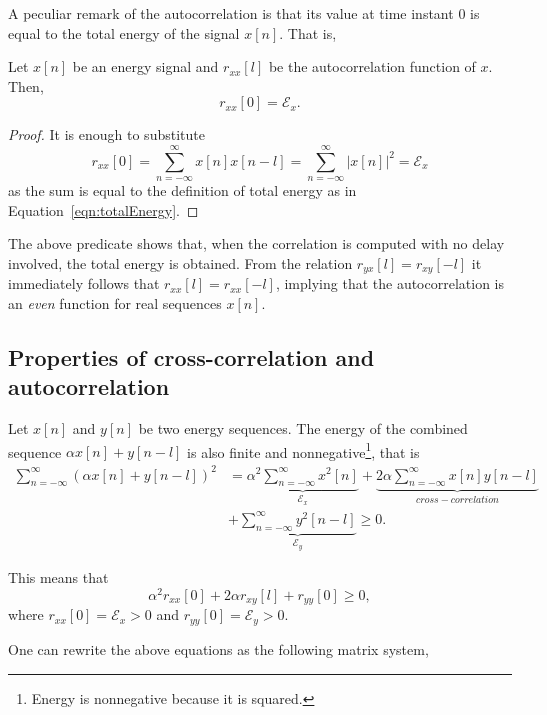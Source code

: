 \documentclass[\documentfontsize, twocolumn]{\classname}
\begin{document}
A peculiar remark of the autocorrelation is that its value at time instant $0$ is equal to the total energy of the signal $x[n]$. That is,

\begin{predicate}
    Let $x[n]$ be an energy signal and $r_{xx}[l]$ be the autocorrelation function of $x$. Then, 
    \begin{equation}\label{eqn:equivalenceAutocorrelationEnergy}
        r_{xx}[0] = \mathcal E_x.
    \end{equation}
\end{predicate}

\begin{proof}
    It is enough to substitute
    \[
        r_{xx}[0] = \sum_{n=-\infty}^\infty x[n]x[n-l] =\sum_{n=-\infty}^\infty |x[n]|^2 = \mathcal E_x
    \]
    as the sum is equal to the definition of total energy as in Equation~\ref{eqn:totalEnergy}.
\end{proof}

The above predicate shows that, when the correlation is computed with no delay involved, the total energy is obtained. From the relation $r_{yx}[l] = r_{xy}[-l]$ it immediately follows that $r_{xx}[l] = r_{xx}[-l]$, implying that the autocorrelation is an \emph{even} function for real sequences $x[n]$.

\subsection{Properties of cross-correlation and autocorrelation}
Let $x[n]$ and $y[n]$ be two energy sequences. The energy of the combined sequence $\alpha x[n] + y[n-l]$ is also finite and nonnegative\footnote{Energy is nonnegative because it is squared.}, that is
\begin{align*}
    \sum_{n=-\infty}^\infty (\alpha x[n] + y[n-l])^2 &= \underbrace{\alpha^2 \sum_{n=-\infty}^\infty x^2[n]}_{\mathcal E_x} + \underbrace{2\alpha \sum_{n=-\infty}^\infty x[n] y[n-l]}_{cross-correlation}\\ &+ \underbrace{\sum_{n=-\infty}^\infty y^2[n-l]}_{\mathcal E_y} \geq 0.
\end{align*}

This means that 
\[
    \alpha^2 r_{xx}[0] + 2\alpha r_{xy}[l] + r_{yy}[0] \geq 0,
\]
where $r_{xx}[0] = \mathcal E_x > 0$ and $r_{yy}[0] = \mathcal E_y > 0$.

One can rewrite the above equations as the following matrix system,
\end{document}

